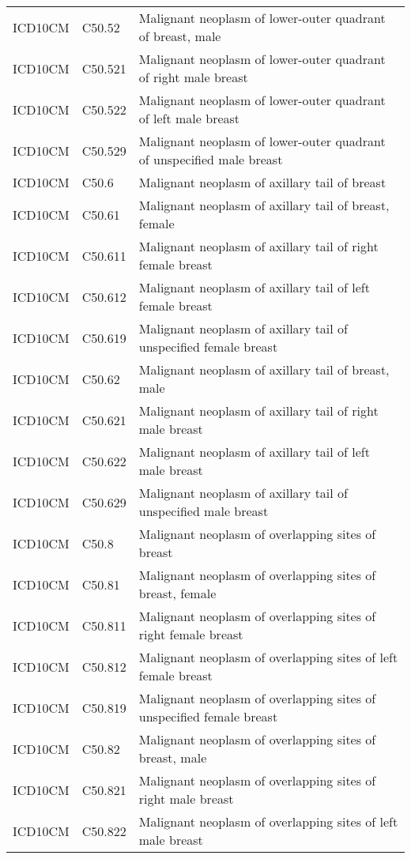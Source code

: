 \begin{table}[ht]
\begin{tabular}{lll}
  ICD10CM & C50.52 & Malignant neoplasm of lower-outer quadrant of breast, male \\ 
  ICD10CM & C50.521 & Malignant neoplasm of lower-outer quadrant of right male breast \\ 
  ICD10CM & C50.522 & Malignant neoplasm of lower-outer quadrant of left male breast \\ 
  ICD10CM & C50.529 & Malignant neoplasm of lower-outer quadrant of unspecified male breast \\ 
  ICD10CM & C50.6 & Malignant neoplasm of axillary tail of breast \\ 
  ICD10CM & C50.61 & Malignant neoplasm of axillary tail of breast, female \\ 
  ICD10CM & C50.611 & Malignant neoplasm of axillary tail of right female breast \\ 
  ICD10CM & C50.612 & Malignant neoplasm of axillary tail of left female breast \\ 
  ICD10CM & C50.619 & Malignant neoplasm of axillary tail of unspecified female breast \\ 
  ICD10CM & C50.62 & Malignant neoplasm of axillary tail of breast, male \\ 
  ICD10CM & C50.621 & Malignant neoplasm of axillary tail of right male breast \\ 
  ICD10CM & C50.622 & Malignant neoplasm of axillary tail of left male breast \\ 
  ICD10CM & C50.629 & Malignant neoplasm of axillary tail of unspecified male breast \\ 
  ICD10CM & C50.8 & Malignant neoplasm of overlapping sites of breast \\ 
  ICD10CM & C50.81 & Malignant neoplasm of overlapping sites of breast, female \\ 
  ICD10CM & C50.811 & Malignant neoplasm of overlapping sites of right female breast \\ 
  ICD10CM & C50.812 & Malignant neoplasm of overlapping sites of left female breast \\ 
  ICD10CM & C50.819 & Malignant neoplasm of overlapping sites of unspecified female breast \\ 
  ICD10CM & C50.82 & Malignant neoplasm of overlapping sites of breast, male \\ 
  ICD10CM & C50.821 & Malignant neoplasm of overlapping sites of right male breast \\ 
  ICD10CM & C50.822 & Malignant neoplasm of overlapping sites of left male breast \\ 

\end{tabular}
\end{table}
